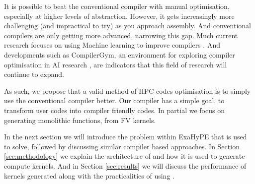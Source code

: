 It is possible to beat the conventional compiler with manual optimisation, especially at higher levels of abstraction.
However, it gets increasingly more challenging (and impractical to try) as you approach assembly.
And conventional compilers are only getting more advanced, narrowing this gap.   
Much current research focuses on using Machine learning to improve compilers \cite{compiler-ml-opt,lots-of-compiler-options}.
And developments such as CompilerGym, an environment for exploring compiler optimisation in AI research \cite{compiler-gym}, are indicators that this field of research will continue to expand. 

As such, we propose that a valid method of HPC codes optimisation is to simply use the conventional compiler better.
Our \phlat compiler has a simple goal, to transform user codes into compiler friendly codes.    
In partial we focus on generating monolithic functions, from FV kernels.

In the next section we will introduce the problem within ExaHyPE that \phlat is used to solve, followed by discussing similar compiler based approaches.
In Section \ref{sec:methodology} we explain the architecture of \phlat and how it is used to generate compute kernels.
And in Section \ref{sec:results} we will discuss the performance of kernels generated along with the practicalities of using \phlat. 